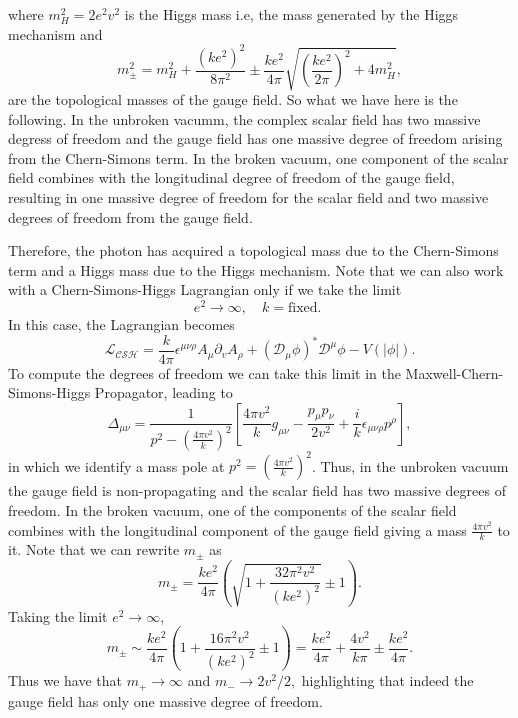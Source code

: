 \documentclass{article}
\begin{document}
where $m_{H}^{2}=2e^{2}v^{2}$  is the Higgs mass i.e, the mass generated by the Higgs mechanism and 
\begin{equation}
	m_{\pm}^{2}=m_{H}^{2}+\frac{(ke^{2})^{2}}{8\pi^2}\pm\frac{ke^{2}}{4\pi}\sqrt{\left(\frac{ke^2}{2\pi}\right)^2+4m_{H}^{2}},
\end{equation}
are the topological masses of the gauge field. So what we have here is the following. In the unbroken vacumm, the complex scalar field has two massive degress of freedom and the gauge field has one massive degree of freedom arising from the Chern-Simons term. In the broken vacuum, one component of the scalar field combines with the longitudinal degree of freedom of the gauge field, resulting in one massive degree of freedom for the scalar field and two massive degrees of freedom from the gauge field.

Therefore, the photon has acquired a topological mass due to the Chern-Simons term and a Higgs mass due to the Higgs mechanism. Note that we can also work with a Chern-Simons-Higgs Lagrangian only if we take the limit
\begin{equation}
	e^2\to\infty,\quad k=\text{fixed. }
\end{equation}
In this case, the Lagrangian becomes
\begin{equation}
	\mathcal{L_{\text{CSH}}}=\frac{k}{4\pi}\epsilon^{\mu\nu\rho}A_{\mu}\partial_{v}A_{\rho}+(\mathcal{D_{\mu}\phi})^{*}\mathcal{D^{\mu}}\phi-V(|\phi|).
\end{equation}
To compute the degrees of freedom we can take this limit in the Maxwell-Chern-Simons-Higgs Propagator, leading to 
\begin{equation}
	\Delta_{\mu\nu}=\frac{1}{p^{2}-\left(\frac{4\pi v^{2}}{k}\right)^{2}}\left[\frac{4\pi v^{2}}{k}g_{\mu\nu}-\frac{p_{\mu}p_{\nu}}{2v^{2}}+\frac{i}{k}\epsilon_{\mu\nu\rho}p^{\rho}\right],
\end{equation}
in which we identify a mass pole at $p^{2}=\left(\frac{4\pi v^{2}}{k}\right)^{2}$.  Thus, in the unbroken vacuum the gauge field is non-propagating and the scalar field has two massive degrees of freedom. In the broken vacuum, one of the components of the scalar field combines with the longitudinal component of the gauge field giving a mass $\frac{4\pi v^{2}}{k}$ to it. Note that we can rewrite $m_{\pm}$  as 
\begin{equation}
	m_{\pm}=\frac{ke^{2}}{4\pi}\left(\sqrt{1+\frac{32\pi^{2}v^2}{(ke^2)^{2}}}\pm1\right).
\end{equation}
Taking the limit $e^2\to\infty$, 
\begin{equation}
	m_{\pm}\sim\frac{ke^{2}}{4\pi}\left(1+\frac{16\pi^2v^{2}}{(ke^2)^{2}}\pm1\right)=\frac{ke^{2}}{4\pi}+\frac{4v^{2}}{k\pi}\pm\frac{ke^{2}}{4\pi}.
\end{equation}
Thus we have that $m_{+}\to\infty$ and $m_{-}\to2v^{2}/2,$ highlighting that indeed the gauge field has only one massive degree of freedom. 
\end{document}

